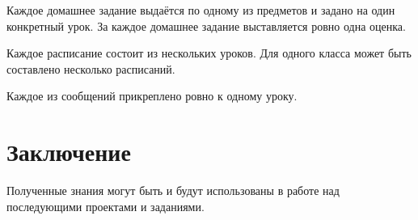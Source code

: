 \documentclass[a4paper, final]{article}
\begin{document}
Каждое домашнее задание выдаётся по одному из предметов и задано на один конкретный урок. За каждое домашнее задание выставляется ровно одна оценка.

Каждое расписание состоит из нескольких уроков. Для одного класса может быть составлено несколько расписаний.

Каждое из сообщений прикреплено ровно к одному уроку.


\newpage
\section*{Заключение}
Полученные знания могут быть и будут использованы в работе над последующими проектами и заданиями.

\cleardoublepage
{}
\newpage
\begin{thebibliography}{0}
\end{thebibliography}
\end{document}
